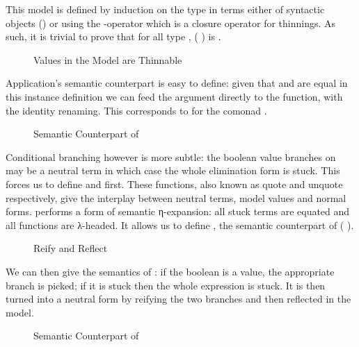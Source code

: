 This model is defined by induction on the type in terms either of
syntactic objects () or using the -operator which is
a closure operator for thinnings. As such, it is trivial to prove
that for all type , ( ) is .

\begin{figure}[h]
\caption{Values in the Model are Thinnable\label{fig:thnbemodel}}
\end{figure}

Application's semantic counterpart is easy to define: given that 
and  are equal in this instance definition we can feed the argument
directly to the function, with the identity renaming. This corresponds to
 for the comonad .

\begin{figure}[h]
\caption{Semantic Counterpart of \label{fig:nbeapp}}
\end{figure}

Conditional branching however is more subtle: the boolean value 
branches on may be a neutral term in which case the whole elimination form
is stuck. This forces us to define  and  first.
These functions, also known as quote and unquote respectively, give the
interplay between neutral terms, model values and normal forms.
 performs a form of semantic η-expansion: all stuck 
terms are equated and all functions are λ-headed. It allows us to define
, the semantic counterpart of ( ).

\begin{figure}[h]
\caption{Reify and Reflect\label{fig:reifyreflectnbe}}
\end{figure}

We can then give the semantics of : if the boolean is a value, the
appropriate branch is picked; if it is stuck then the whole expression is stuck.
It is then turned into a neutral form by reifying the two branches and then reflected
in the model.

\begin{figure}[h]
\caption{Semantic Counterpart of \label{fig:nbeifte}}
\end{figure}

